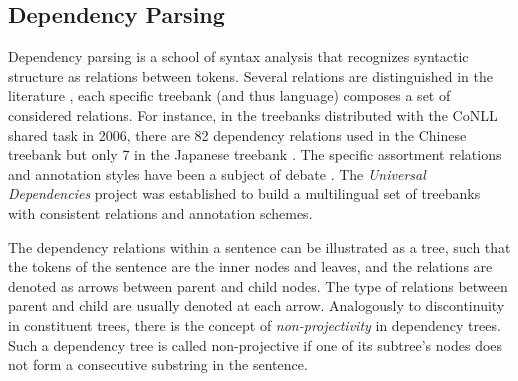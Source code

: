 \documentclass[../document.tex]{subfiles}
\begin{document}
    \subsection{Dependency Parsing}
    Dependency parsing is a school of syntax analysis that recognizes syntactic structure as relations between tokens.
    Several relations are distinguished in the literature \citep[Table~3 shows the list of dependency relations annotated in the Universal Dependencies treebanks]{de2021universal}, each specific treebank (and thus language) composes a set of considered relations.
    For instance, in the treebanks distributed with the CoNLL shared task in 2006, there are 82 dependency relations used in the Chinese treebank but only 7 in the Japanese treebank \citep[Table~1]{buchholz2006conll}.
    The specific assortment relations and annotation styles have been a subject of debate \citep{Gerdes2016DependencyAC,Rehbein2017UniversalDA,osborne2019status}.
    The \emph{Universal Dependencies} project \citep{de2021universal} was established to build a multilingual set of treebanks with consistent relations and annotation schemes.

    The dependency relations within a sentence can be illustrated as a tree, such that the tokens of the sentence are the inner nodes and leaves, and the relations are denoted as arrows between parent and child nodes.
    The type of relations between parent and child are usually denoted at each arrow.
    Analogously to discontinuity in constituent trees, there is the concept of \emph{non-projectivity} in dependency trees.
    Such a dependency tree is called non-projective if one of its subtree's nodes does not form a consecutive substring in the sentence.
\end{document}
